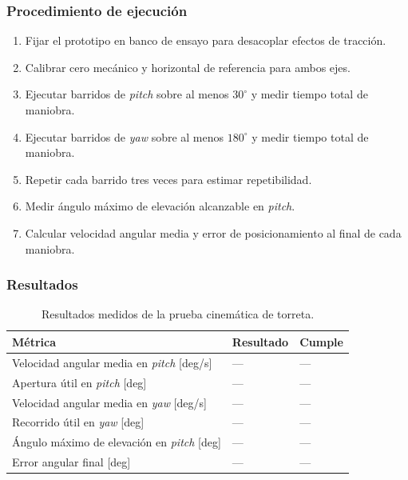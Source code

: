 \subsubsection{Procedimiento de ejecución}

\begin{enumerate}
    \item Fijar el prototipo en banco de ensayo para desacoplar efectos de tracción.
    \item Calibrar cero mecánico y horizontal de referencia para ambos ejes.
    \item Ejecutar barridos de \textit{pitch} sobre al menos $30^\circ$ y medir tiempo total de maniobra.
    \item Ejecutar barridos de \textit{yaw} sobre al menos $180^\circ$ y medir tiempo total de maniobra.
    \item Repetir cada barrido tres veces para estimar repetibilidad.
    \item Medir ángulo máximo de elevación alcanzable en \textit{pitch}.
    \item Calcular velocidad angular media y error de posicionamiento al final de cada maniobra.
\end{enumerate}

\subsubsection{Resultados}

\begin{table}[H]
\centering
\small
\begin{tabular}{p{8.8cm} p{2.2cm} p{2.8cm}}
\toprule
\textbf{Métrica} & \textbf{Resultado} & \textbf{Cumple} \\
\midrule
Velocidad angular media en \textit{pitch} [deg/s] & --- & --- \\
Apertura útil en \textit{pitch} [deg] & --- & --- \\
Velocidad angular media en \textit{yaw} [deg/s] & --- & --- \\
Recorrido útil en \textit{yaw} [deg] & --- & --- \\
Ángulo máximo de elevación en \textit{pitch} [deg] & --- & --- \\
Error angular final [deg] & --- & --- \\
\bottomrule
\end{tabular}
\caption{Resultados medidos de la prueba cinemática de torreta.}
\label{tab:resultados_prueba_canon}
\end{table}
